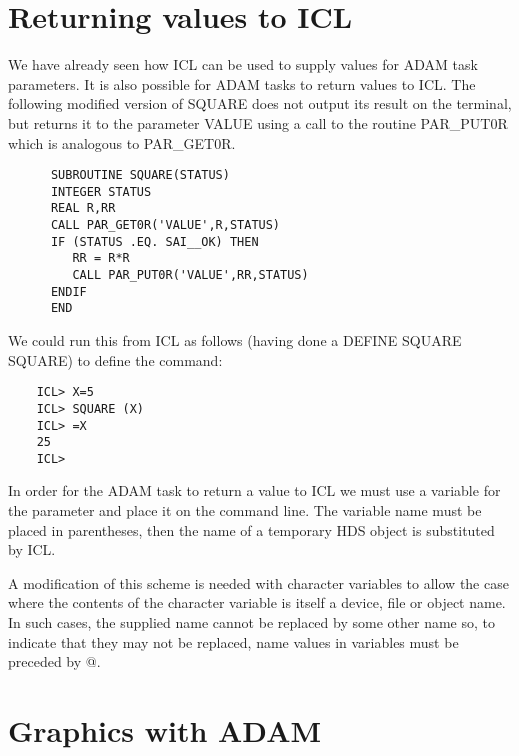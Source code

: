 \section{Returning values to ICL}
\label{retval}
We have already seen how ICL can be used to supply values for ADAM task
parameters. It is also possible for ADAM tasks to return values to ICL.
The following modified version of SQUARE does not output its result on the
terminal, but returns it to the parameter VALUE using a call to the routine
PAR\_PUT0R which is analogous to PAR\_GET0R.

\begin{verbatim}
      SUBROUTINE SQUARE(STATUS)
      INTEGER STATUS
      REAL R,RR
      CALL PAR_GET0R('VALUE',R,STATUS)
      IF (STATUS .EQ. SAI__OK) THEN      
         RR = R*R           
         CALL PAR_PUT0R('VALUE',RR,STATUS)
      ENDIF
      END
\end{verbatim}                            

We could run this from ICL as follows (having done a DEFINE SQUARE SQUARE)
to define the command:

\begin{verbatim}
    ICL> X=5
    ICL> SQUARE (X)
    ICL> =X
    25
    ICL>
\end{verbatim}

In order for the ADAM task to return a value to ICL we must use a variable
for the parameter and place it on the command line. The variable name must
be placed in parentheses, then the name of a temporary HDS object is 
substituted by ICL.

A modification of this scheme is needed with character variables to allow the
case where the contents of the character variable is itself a device, file or 
object name. 
In such cases, the supplied name cannot be replaced by some other name so, 
to indicate that they may not be replaced, name values in variables must be 
preceded by @.

\section{Graphics with ADAM}                                                

